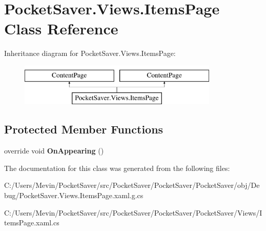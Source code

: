 \hypertarget{class_pocket_saver_1_1_views_1_1_items_page}{}\section{Pocket\+Saver.\+Views.\+Items\+Page Class Reference}
\label{class_pocket_saver_1_1_views_1_1_items_page}
Inheritance diagram for Pocket\+Saver.\+Views.\+Items\+Page\+:\begin{figure}[H]
\begin{center}
\leavevmode
\includegraphics[height=2.000000cm]{class_pocket_saver_1_1_views_1_1_items_page}
\end{center}
\end{figure}
\subsection*{Protected Member Functions}
\begin{DoxyCompactItemize}
\item 
\mbox{\label{class_pocket_saver_1_1_views_1_1_items_page_acab1e8c0784e7ea4116250dcc902ef32}} 
override void {\bfseries On\+Appearing} ()
\end{DoxyCompactItemize}


The documentation for this class was generated from the following files\+:\begin{DoxyCompactItemize}
\item 
C\+:/\+Users/\+Mevin/\+Pocket\+Saver/src/\+Pocket\+Saver/\+Pocket\+Saver/\+Pocket\+Saver/obj/\+Debug/Pocket\+Saver.\+Views.\+Items\+Page.\+xaml.\+g.\+cs\item 
C\+:/\+Users/\+Mevin/\+Pocket\+Saver/src/\+Pocket\+Saver/\+Pocket\+Saver/\+Pocket\+Saver/\+Views/Items\+Page.\+xaml.\+cs\end{DoxyCompactItemize}
